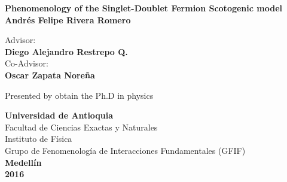 \pagestyle{empty}


\begin{center}


\vspace*{2.5cm} {\bf{\Large{Phenomenology of the Singlet-Doublet Fermion Scotogenic model }}}
\\
\vspace{2.5cm} \bf{\Large{Andr\'es Felipe Rivera Romero}}
\\
\vspace{2.0cm}

{\large Advisor:}\\
{\bf\large Diego Alejandro Restrepo Q.}\\
\vspace{1.0cm}
{\large Co-Advisor:}\\
{\bf\large Oscar Zapata Nore\~na}\\
\vspace{2.0cm}

Presented by obtain the Ph.D in physics
\vspace{2.5cm}

{\bf{ \Large{Universidad de Antioquia}}} \\
{\large{Facultad de Ciencias Exactas y Naturales}}\\
{\large{Instituto de F\'isica}} \\
{\large{Grupo de Fenomenolog\'ia de Interacciones Fundamentales (GFIF)}} \\
\vspace{1cm} {\bf\large Medell\'in \\ 2016}
\end{center}
